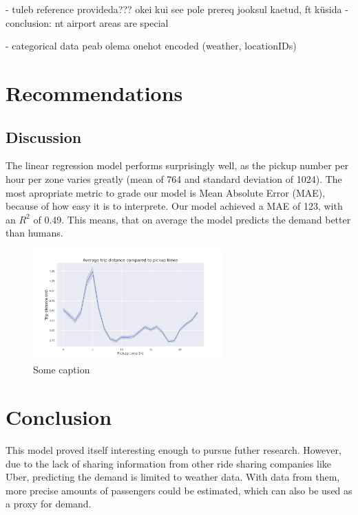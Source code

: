 \documentclass[11pt]{article}
\begin{document}
    - tuleb reference provideda??? okei kui see pole prereq jooksul kaetud, ft küsida
    - conclusion: nt airport areas are special

- categorical data peab olema onehot encoded (weather, locationIDs)
\fi


\section{Recommendations}


\subsection{Discussion} \label{discussion}

The linear regression model performs surprisingly well, as the pickup number per hour per zone varies greatly (mean of 764 and standard deviation of 1024). The most apropriate metric to grade our model is Mean Absolute Error (MAE), because of how easy it is to interprete. Our model achieved a MAE of 123, with an $R^2$ of 0.49. This means, that on average the model predicts the demand better than humans.

\begin{figure}[h]
    \includegraphics[width=0.65\textwidth]{pickuptime_distance.jpeg}
    \centering
    \caption{Some caption} %
\end{figure}

\section{Conclusion}

This model proved itself interesting enough to pursue futher research. However, due to the lack of sharing information from other ride sharing companies like Uber, predicting the demand is limited to weather data. With data from them, more precise amounts of passengers could be estimated, which can also be used as a proxy for demand.


\clearpage

\printbibliography
\end{document}
